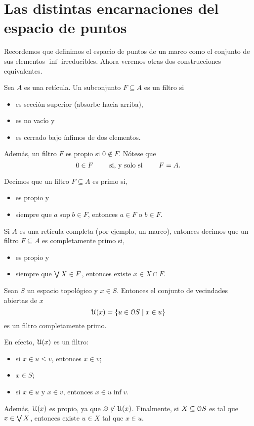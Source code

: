 \section{Las distintas encarnaciones del espacio de puntos}

Recordemos que definimos el espacio de puntos de un marco
como el conjunto de sus elementos $\inf$-irreducibles.
Ahora veremos otras dos construcciones equivalentes.

\begin{definition}
    Sea $A$ es una retícula.
    Un subconjunto $F\subseteq A$ es un filtro si
    \begin{itemize}
        \item es sección superior (absorbe hacia arriba),
        \item es no vacío y
        \item es cerrado bajo ínfimos de dos elementos.
    \end{itemize}
    Además, un filtro $F$ es propio si $0\nin F$.
    Nótese que
    \[
        0\in F \ssi F=A
    .\]
    
    Decimos que un filtro $F\subseteq A$ es primo si,
    \begin{itemize}
        \item es propio y
        \item siempre que $a\sup b\in F$, entonces $a\in F$ o $b\in F$.
    \end{itemize}
    
    Si $A$ es una retícula completa (por ejemplo, un marco),
    entonces decimos que un filtro $F\subseteq A$ es completamente
    primo si,
    \begin{itemize}
        \item es propio y
        \item siempre que $\Sup X\in F$, entonces existe $x\in X\cap F$.
    \end{itemize}
\end{definition}

\begin{example}
    Sean $S$ un espacio topológico y $x\in S$.
    Entonces el conjunto de vecindades abiertas de $x$
    \[
        \cal U(x) = \{u\in \cal OS\mid x\in u\}
    \]
    es un filtro completamente primo.
    
    En efecto, $\cal U(x)$ es un filtro:
    \begin{itemize}
        \item si $x\in u\leq v$, entonces $x\in v$;
        \item $x\in S$;
        \item si $x\in u$ y $x\in v$, entonces $x\in u\inf v$.
    \end{itemize}
    Además,  $\cal U(x)$ es propio, ya que $\emptyset\nin\cal U(x)$.
    Finalmente, si $X\subseteq \cal OS$ es tal que $x\in \Sup X$,
    entonces existe $u\in X$ tal que $x\in u$.
\end{example}

